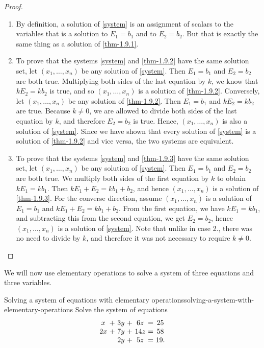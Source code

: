 \begin{proof}
  \begin{enumerate}
  \item By definition, a solution of \eqref{system} is an assignment of
    scalars to the variables that is a solution to $E_1=b_1$ and to
    $E_2=b_2$. But that is exactly the same thing as a solution of
    \eqref{thm-1.9.1}.

  \item To prove that the systems \eqref{system} and \eqref{thm-1.9.2}
    have the same solution set, let $(x_1,\ldots,x_n)$ be
    any solution of \eqref{system}. Then $E_1=b_1$ and $E_2=b_2$ are
    both true. Multiplying both sides of the last equation by $k$, we
    know that $kE_2=kb_2$ is true, and so
    $(x_1,\ldots,x_n)$ is a solution of
    \eqref{thm-1.9.2}. Conversely, let $(x_1,\ldots,x_n)$
    be any solution of \eqref{thm-1.9.2}.  Then $E_1=b_1$ and $kE_2=kb_2$
    are true. Because $k\neq 0$, we are allowed to divide both sides of
    the last equation by $k$, and therefore $E_2=b_2$ is true. Hence,
    $(x_1,\ldots,x_n)$ is also a solution of
    \eqref{system}. Since we have shown that every solution of
    \eqref{system}  is a solution of \eqref{thm-1.9.2} and vice versa,
    the two systems are equivalent.

  \item To prove that the systems \eqref{system} and \eqref{thm-1.9.3}
    have the same solution set, let $(x_1,\ldots,x_n)$ be
    any solution of \eqref{system}. Then $E_1=b_1$ and $E_2=b_2$ are
    both true. We multiply both sides of the first equation by $k$ to
    obtain $kE_1=kb_1$. Then $kE_1+E_2 = kb_1+b_2$, and hence
    $(x_1,\ldots,x_n)$ is a solution of
    \eqref{thm-1.9.3}. For the converse direction, assume
    $(x_1,\ldots,x_n)$ is a solution of $E_1=b_1$ and
    $kE_1+E_2 = kb_1+b_2$. From the first equation, we have $kE_1=kb_1$,
    and subtracting this from the second equation, we get $E_2=b_2$,
    hence $(x_1,\ldots,x_n)$ is a solution of
    \eqref{system}. Note that unlike in case 2., there was no need to
    divide by $k$, and therefore it was not necessary to require $k\neq 0$.
  \end{enumerate}
\end{proof}

We will now use elementary operations to solve a system of three
equations and three variables.

\begin{example}{Solving a system of equations with elementary operations}{solving-a-system-with-elementary-operations}
  Solve the system of equations
  \begin{equation*}
    \begin{array}{c@{~}c@{~}c@{~}c@{~}c@{~}c@{~}c}
      x&+&3y&+&6z&=&25 \\
      2x&+&7y&+&14z&=&58 \\
       &&2y&+&5z&=&19.
    \end{array}
    \label{solving-a-system1}
  \end{equation*}
\end{example}

